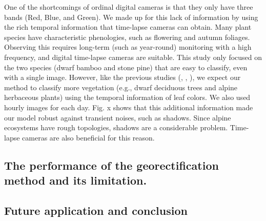 \documentclass{article}
\begin{document}
One of the shortcomings of ordinal digital cameras is that they only have three bands (Red, Blue, and Green). We made up for this lack of information by using the rich temporal information that time-lapse cameras can obtain. Many plant species have characteristic phenologies, such as flowering and autumn foliages. Observing this requires long-term (such as year-round) monitoring with a high frequency, and digital time-lapse cameras are suitable. This study only focused on the two species (dwarf bamboo and stone pine) that are easy to classify, even with a single image. However, like the previous studies (\cite{Tigges2013RemSenEnv}, \cite{Son2013RemSen}, \cite{Heupel2018PFG}), we expect our method to classify more vegetation (e.g., dwarf deciduous trees and alpine herbaceous plants) using the temporal information of leaf colors. We also used hourly images for each day. Fig. x shows that this additional information made our model robust against transient noises, such as shadows. Since alpine ecosystems have rough topologies, shadows are a considerable problem. Time-lapse cameras are also beneficial for this reason.

\hypertarget{the-performance-of-the-georectification-method-and-its-limitation.}{%
\subsection{The performance of the georectification method and its limitation.}\label{the-performance-of-the-georectification-method-and-its-limitation.}}

\hypertarget{future-application-and-conclusion}{%
\subsection{Future application and conclusion}\label{future-application-and-conclusion}}



\end{document}
